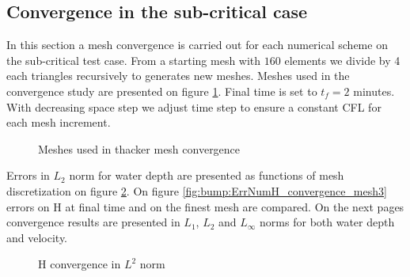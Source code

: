 \subsection{Convergence in the sub-critical case}

In this section a mesh convergence is carried out for each numerical scheme on the sub-critical test case. 
From a starting mesh with $160$ elements we divide by 4 each triangles recursively to generates new meshes.
Meshes used in the convergence study are presented on figure \ref{t2d:cone:meshes}. 
Final time is set to $t_f=2$ minutes.
With decreasing space step we adjust time step to ensure a constant CFL for each mesh increment.

\begin{figure}[H]
\begin{minipage}[t]{\textwidth}
 \centering
\end{minipage}
\begin{minipage}[t]{\textwidth}
 \centering
\end{minipage}
\begin{minipage}[t]{\textwidth}
 \centering
\end{minipage}
\begin{minipage}[t]{\textwidth}
 \centering
\end{minipage}
 \caption{Meshes used in thacker mesh convergence}
 \label{t2d:cone:meshes}
\end{figure}

Errors in $L_2$ norm for water depth
are presented as functions of mesh discretization on figure
\ref{fig:bump:ErrNumH_convergence}. On figure \ref{fig:bump:ErrNumH_convergence_mesh3} errors on H
at final time and on the finest mesh are compared.
On the next pages convergence results are presented in $L_1$, $L_2$ and $L_{\infty}$ norms for both water depth and velocity.

\begin{figure}[H]
\centering
  \caption{H convergence in $L^2$ norm}
\label{fig:bump:ErrNumH_convergence}
\end{figure}


